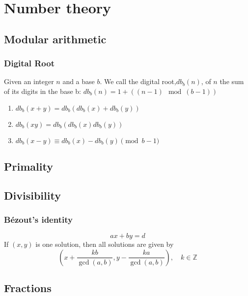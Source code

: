 \chapter{Number theory}

\section{Modular arithmetic}
	
	\subsection{Digital Root}
	Given an integer $n$ and a base $b$. We call the digital root,$db_b(n)$, of $n$ the sum of its digits in the base b:
	$db_b(n) = 1 + ((n-1) \mod (b-1))$
	\begin{enumerate}
		\item $db_b(x+y) = db_b(db_b(x)+db_b(y))$
		\item $db_b(xy) = db_b(db_b(x)db_b(y))$
		\item $db_b(x-y) \equiv db_b(x)-db_b(y) \pmod{b-1}$
	\end{enumerate}


\section{Primality}

\section{Divisibility}

	\subsection{Bézout's identity}
	$$ax+by=d$$
	If $(x,y)$ is one solution, then all solutions are given by
	$$\left(x+\frac{kb}{\gcd(a,b)}, y-\frac{ka}{\gcd(a,b)}\right), \quad k\in\mathbb{Z}$$


\section{Fractions}

